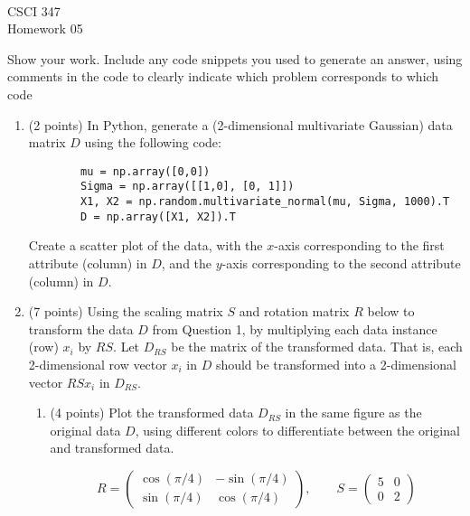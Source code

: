 \documentclass[11pt]{article}
\newcommand{\course}{CSCI 347}
\newcommand{\proj}{Homework 05}
\begin{document}
{ ~\\
    \course \\ 
    \proj \\ 
}

Show your work. Include any code snippets you used to generate an answer, using
comments in the code to clearly indicate which problem corresponds to which code

\begin{enumerate}

    \item (2 points) In Python, generate a (2-dimensional multivariate Gaussian)
    data matrix $D$ using the following code:

    \begin{verbatim}
        mu = np.array([0,0])
        Sigma = np.array([[1,0], [0, 1]])
        X1, X2 = np.random.multivariate_normal(mu, Sigma, 1000).T
        D = np.array([X1, X2]).T
    \end{verbatim}

    Create a scatter plot of the data, with the $x$-axis corresponding to the
    first attribute (column) in $D$, and the $y$-axis corresponding to the
    second attribute (column) in $D$.

    \item (7 points) Using the scaling matrix $S$ and rotation matrix $R$ below
    to transform the data $D$ from Question 1, by multiplying each data instance
    (row) $x_i$ by $RS$. Let $D_{RS}$ be the matrix of
    the transformed data. That is, each 2-dimensional row vector $x_i$
    in $D$ should be transformed into a 2-dimensional vector $RSx_i$ in $D_{RS}$.

    \begin{enumerate}

        \item (4 points) Plot the transformed data $D_{RS}$ in the same figure
        as the original data $D$, using different colors to differentiate
        between the original and transformed data.

        $$
            R = \begin{pmatrix}
                \cos(\pi/4) & -\sin(\pi/4) \\
                \sin(\pi/4) & \cos(\pi/4)
            \end{pmatrix},
            \qquad
            S = \begin{pmatrix}
                5 & 0 \\
                0 & 2
            \end{pmatrix}
        $$


\end{enumerate}
\end{enumerate}
\end{document}
